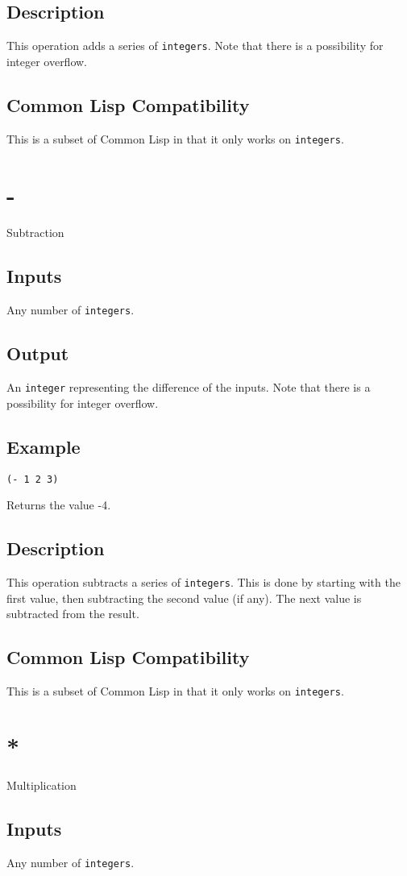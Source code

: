 \documentclass[10pt, openany]{book}
\newcommand{\datatype}[1]{\texttt{#1}}
\newcommand{\cl}{Common Lisp}
\begin{document}
\subsection{Description}
This operation adds a series of \datatype{integers}.  Note that there is a possibility for integer overflow.
\subsection{Common Lisp Compatibility}
This is a subset of \cl{} in that it only works on \datatype{integers}.

\section{-}
Subtraction
\subsection{Inputs}
Any number of \datatype{integers}.
\subsection{Output}
An \datatype{integer} representing the difference of the inputs.  Note that there is a possibility for integer overflow.
\subsection{Example}
\begin{lstlisting}
(- 1 2 3)
\end{lstlisting}
Returns the value -4.
\subsection{Description}
This operation subtracts a series of \datatype{integers}.  This is done by starting with the first value, then subtracting the second value (if any).  The next value is subtracted from the result.
\subsection{Common Lisp Compatibility}
This is a subset of \cl{} in that it only works on \datatype{integers}.

\section{*}
Multiplication
\subsection{Inputs}
Any number of \datatype{integers}.
\end{document}
